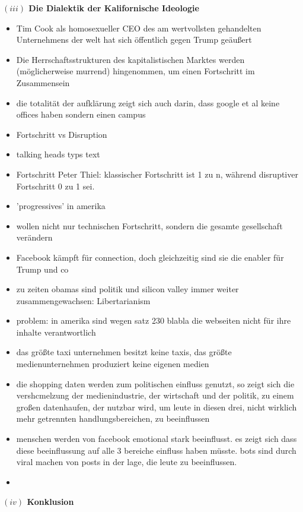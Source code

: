 \documentclass[a4paper, 12pt]{article}
\begin{document}
\begin{onehalfspace}
\vspace{5mm}
\noindent\textbf{$(iii)$ Die Dialektik der Kalifornische Ideologie}

\noindent 

\begin{itemize}
  \item Tim Cook als homosexueller CEO des am wertvollsten gehandelten Unternehmens der welt hat sich öffentlich gegen Trump geäußert
  \item Die Herrschaftsstrukturen des kapitalistischen Marktes werden (möglicherweise murrend) hingenommen, um einen Fortschritt im Zusammensein 
  \item die totalität der aufklärung zeigt sich auch darin, dass google et al keine offices haben sondern einen campus
  \item Fortschritt vs Disruption
  \item talking heads typs text
  \item Fortschritt Peter Thiel: klassischer Fortschritt ist 1 zu n, während disruptiver Fortschritt 0 zu 1 sei.
  \item 'progressives' in amerika
  \item wollen nicht nur technischen Fortschritt, sondern die gesamte gesellschaft verändern
  \item Facebook kämpft für connection, doch gleichzeitig sind sie die enabler für Trump und co
  \item zu zeiten obamas sind politik und silicon valley immer weiter zusammengewachsen: Libertarianism 
  \item problem: in amerika sind wegen satz 230 blabla die webseiten nicht für ihre inhalte verantwortlich
  \item das größte taxi unternehmen besitzt keine taxis, das größte medienunternehmen produziert keine eigenen medien
  \item die shopping daten werden zum politischen einfluss genutzt, so zeigt sich die vershcmelzung der medienindustrie, der wirtschaft und der politik, zu einem großen datenhaufen, der nutzbar wird, um leute in diesen drei, nicht wirklich mehr getrennten handlungsbereichen, zu beeinflussen
  \item menschen werden von facebook emotional stark beeinflusst. es zeigt sich dass diese beeinflussung auf alle 3 bereiche einfluss haben müsste. bots sind durch viral machen von posts in der lage, die leute zu beeinflussen. 
  \item 
\end{itemize}


\vspace{5mm}
\noindent\textbf{$(iv)$ Konklusion}

\noindent  



\end{onehalfspace}
\nocite{*}
\printbibliography
\end{document}
